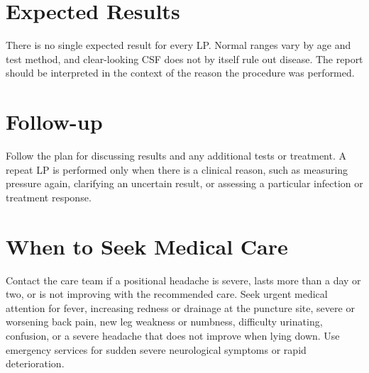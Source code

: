 \section*{Expected Results}
There is no single expected result for every LP. Normal ranges vary by age and test method, and clear-looking CSF does not by itself rule out disease. The report should be interpreted in the context of the reason the procedure was performed.

\section*{Follow-up}
Follow the plan for discussing results and any additional tests or treatment. A repeat LP is performed only when there is a clinical reason, such as measuring pressure again, clarifying an uncertain result, or assessing a particular infection or treatment response.

\section*{When to Seek Medical Care}
Contact the care team if a positional headache is severe, lasts more than a day or two, or is not improving with the recommended care. Seek urgent medical attention for fever, increasing redness or drainage at the puncture site, severe or worsening back pain, new leg weakness or numbness, difficulty urinating, confusion, or a severe headache that does not improve when lying down. Use emergency services for sudden severe neurological symptoms or rapid deterioration.

